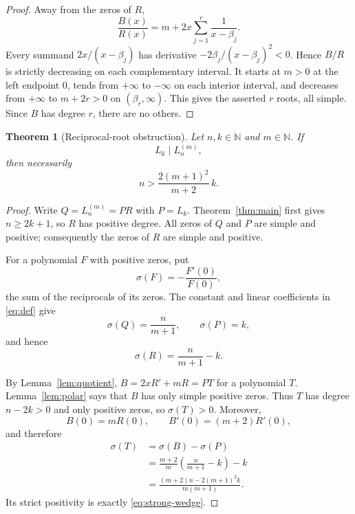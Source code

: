 \documentclass[11pt]{article}
\newtheorem{theorem}{Theorem}
\theoremstyle{remark}
\begin{document}
\begin{proof}
Away from the zeros of $R$,
\[
 \frac{B(x)}{R(x)}=m+2x\sum_{j=1}^r\frac1{x-\beta_j}.
\]
Every summand $2x/(x-\beta_j)$ has derivative
$-2\beta_j/(x-\beta_j)^2<0$.  Hence $B/R$ is strictly decreasing on
each complementary interval.  It starts at $m>0$ at the left endpoint
$0$, tends from $+\infty$ to $-\infty$ on each interior interval, and
decreases from $+\infty$ to $m+2r>0$ on $(\beta_r,\infty)$.  This gives
the asserted $r$ roots, all simple.  Since $B$ has degree $r$, there are no
others.
\end{proof}

\begin{theorem}[Reciprocal-root obstruction]\label{thm:reciprocal}
Let $n,k\in\mathbb N$ and $m\in\mathbb N$.  If
\[
                  L_k\mid L_n^{(m)},
\]
then necessarily
\begin{equation}\label{eq:strong-wedge}
             n>\frac{2(m+1)^2}{m+2}\,k.
\end{equation}
\end{theorem}

\begin{proof}
Write $Q=L_n^{(m)}=PR$ with $P=L_k$.  Theorem~\ref{thm:main} first gives
$n\geq2k+1$, so $R$ has positive degree.  All zeros of $Q$ and $P$ are
simple and positive; consequently the zeros of $R$ are simple and positive.

For a polynomial $F$ with positive zeros, put
\[
             \sigma(F)=-\frac{F'(0)}{F(0)},
\]
the sum of the reciprocals of its zeros.  The constant and linear
coefficients in \eqref{eq:def} give
\[
        \sigma(Q)=\frac{n}{m+1},\qquad \sigma(P)=k,
\]
and hence
\begin{equation}\label{eq:sigma-R}
        \sigma(R)=\frac{n}{m+1}-k.
\end{equation}

By Lemma~\ref{lem:quotient}, $B=2xR'+mR=PT$ for a polynomial $T$.
Lemma~\ref{lem:polar} says that $B$ has only simple positive zeros.  Thus
$T$ has degree $n-2k>0$ and only positive zeros, so $\sigma(T)>0$.
Moreover,
\[
 B(0)=mR(0),\qquad B'(0)=(m+2)R'(0),
\]
and therefore
\[
 \begin{aligned}
 \sigma(T)
   &=\sigma(B)-\sigma(P)\\
   &=\frac{m+2}{m}\left(\frac{n}{m+1}-k\right)-k\\
   &=\frac{(m+2)n-2(m+1)^2k}{m(m+1)}.
 \end{aligned}
\]
Its strict positivity is exactly \eqref{eq:strong-wedge}.
\end{proof}
\end{document}
